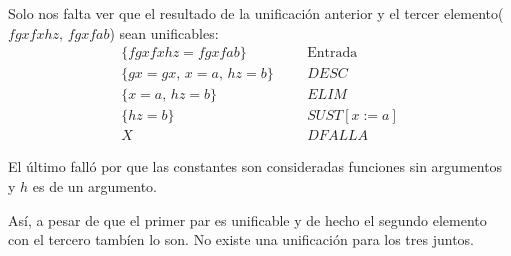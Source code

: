 \documentclass[8pt, letterpaper]{article}
\begin{document}
\begin{enumerate}
\begin{enumerate}
    Solo nos falta ver que el resultado de la unificación anterior y el
    tercer elemento($fgxfxhz,\,fgxfab$) sean unificables:
    \begin{align*}
      \{fgxfxhz = fgxfab\}& &&\text{Entrada}\\
      \{gx = gx,\,x = a,\,hz = b\}& &&DESC\\
      \{x = a,\,hz = b\}& &&ELIM\\
      \{hz = b\}& &&SUST[x:=a]\\
      X&&&DFALLA
    \end{align*}
    
    El último falló por que las constantes son consideradas funciones sin
    argumentos y $h$ es de un argumento.
    
    Así, a pesar de que el primer par es unificable y de hecho
    el segundo elemento con el tercero tambíen lo son. No existe una unificación para los tres juntos.
  \end{enumerate}
\end{enumerate}
\end{document}

